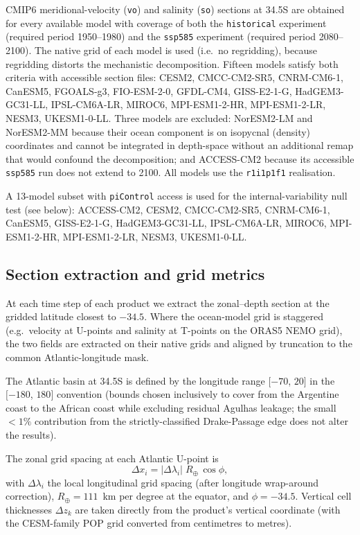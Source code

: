 \documentclass[12pt,a4paper]{article}
\begin{document}
CMIP6 meridional-velocity (\texttt{vo}) and salinity (\texttt{so})
sections at 34.5\textdegree S are obtained for every available model
with coverage of both the \texttt{historical} experiment (required
period 1950--1980) and the \texttt{ssp585} experiment (required period
2080--2100). The native grid of each model is used (i.e.\ no
regridding), because regridding distorts the mechanistic
decomposition. Fifteen models satisfy both criteria with accessible
section files: CESM2, CMCC-CM2-SR5, CNRM-CM6-1, CanESM5, FGOALS-g3,
FIO-ESM-2-0, GFDL-CM4, GISS-E2-1-G, HadGEM3-GC31-LL, IPSL-CM6A-LR,
MIROC6, MPI-ESM1-2-HR, MPI-ESM1-2-LR, NESM3, UKESM1-0-LL. Three
models are excluded: NorESM2-LM and NorESM2-MM because their ocean
component is on isopycnal (density) coordinates and cannot be
integrated in depth-space without an additional remap that would
confound the decomposition; and ACCESS-CM2 because its accessible
\texttt{ssp585} run does not extend to 2100. All models use the
\texttt{r1i1p1f1} realisation.

A 13-model subset with \texttt{piControl} access is used for the
internal-variability null test (see below): ACCESS-CM2, CESM2,
CMCC-CM2-SR5, CNRM-CM6-1, CanESM5, GISS-E2-1-G, HadGEM3-GC31-LL,
IPSL-CM6A-LR, MIROC6, MPI-ESM1-2-HR, MPI-ESM1-2-LR, NESM3,
UKESM1-0-LL.

\subsection*{Section extraction and grid metrics}

At each time step of each product we extract the
zonal--depth section at the gridded latitude closest to
$-34.5$\textdegree. Where the ocean-model grid is staggered
(e.g.\ velocity at U-points and salinity at T-points on the ORAS5
NEMO grid), the two fields are extracted on their native grids and
aligned by truncation to the common Atlantic-longitude mask.

The Atlantic basin at 34.5\textdegree S is defined by the longitude
range $[-70$\textdegree, $20$\textdegree$]$ in the
$[-180$\textdegree, $180$\textdegree$]$ convention (bounds chosen
inclusively to cover from the Argentine coast to the African coast
while excluding residual Agulhas leakage; the small ${<1\%}$
contribution from the strictly-classified Drake-Passage edge does
not alter the results).

The zonal grid spacing at each Atlantic U-point is
\begin{equation}
\Delta x_i = |\Delta\lambda_i|\; R_\oplus\, \cos\phi,
\end{equation}
with $\Delta\lambda_i$ the local longitudinal grid spacing (after
longitude wrap-around correction), $R_\oplus = 111$~km per degree
at the equator, and $\phi = -34.5$\textdegree. Vertical cell
thicknesses $\Delta z_k$ are taken directly from the product's
vertical coordinate (with the CESM-family POP grid converted from
centimetres to metres).
\end{document}
